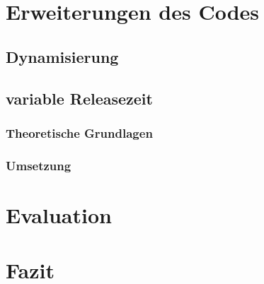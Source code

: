 \documentclass[paper=a4, fontsize=12pt]{scrartcl}
\numberwithin{equation}{section}		%
\numberwithin{figure}{section}			%
\numberwithin{table}{section}				%
\begin{document}
\section{Erweiterungen des Codes}

\subsection{Dynamisierung}
\subsection{variable Releasezeit}
\subsubsection{Theoretische Grundlagen}
\subsubsection{Umsetzung}

\section{Evaluation}

\section{Fazit}





\printbibliography
\end{document}
